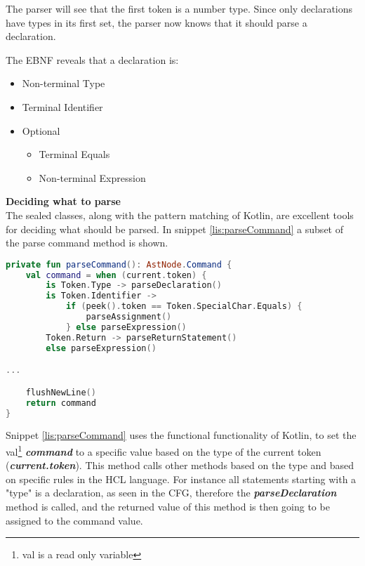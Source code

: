 The parser will see that the first token is a number type. 
Since only declarations have types in its first set, the parser now knows that it should parse a declaration.

The EBNF reveals that a declaration is:
\begin{itemize}
	\item Non-terminal Type
	\item Terminal Identifier
	\item Optional
	\begin{itemize}
		\item Terminal Equals
		\item Non-terminal Expression
	\end{itemize}
\end{itemize}
\textbf{Deciding what to parse}\\
The sealed classes, along with the pattern matching of Kotlin, are excellent tools for deciding what should be parsed. 
In snippet \ref{lis:parseCommand} a subset of the parse command method is shown. 

\begin{lstlisting}[language=Kotlin,label=lis:parseCommand,caption=A simplified version of the parse declaration method from the parser.]
private fun parseCommand(): AstNode.Command {
    val command = when (current.token) {
        is Token.Type -> parseDeclaration()
        is Token.Identifier ->
            if (peek().token == Token.SpecialChar.Equals) {
                parseAssignment()
            } else parseExpression()
        Token.Return -> parseReturnStatement()
        else parseExpression()

...

    flushNewLine()
    return command
}
\end{lstlisting}
Snippet \ref{lis:parseCommand} uses the functional functionality of Kotlin, to set the val\footnote{val is a read only variable} \textit{\textbf{command}} to a specific value based on the type of the current token (\textit{\textbf{current.token}}). 
This method calls other methods based on the type and based on specific rules in the HCL language. 
For instance all statements starting with a "type" is a declaration, as seen in the CFG, therefore the \textit{\textbf{parseDeclaration}} method is called, and the returned value of this method is then going to be assigned to the command value.
	
